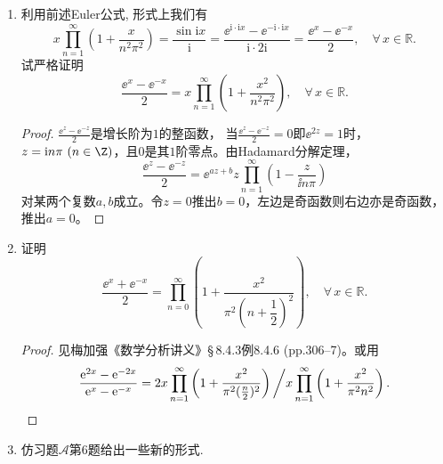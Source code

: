 \begin{4b}
\begin{enumerate}
\item 利用前述Euler公式, 形式上我们有
\[x\prod_{n=1}^{\infty}\left(1+\frac{x}{n^2\pi^2}\right)
=\frac{\sin\mathrm{i}x}{\mathrm{i}}
=\frac{\ee^{\mathrm{i}\cdot\mathrm{i}x}-\ee^{\mathrm{-i}\cdot\mathrm{i}x}}{\mathrm{i}\cdot 2\mathrm{i}}
=\frac{\ee^x-\ee^{-x}}{2},\quad\forall\, x\in\mathbb{R}.\]
试严格证明\[\frac{\ee^{x}-\ee^{-x}}{2}=x\prod_{n=1}^{\infty}\left(1+\frac{x^2}{n^2\pi^2}\right),\quad\forall\, x\in\mathbb{R}.\]
\begin{proof}
    \(\frac{\ee^{z}-\ee^{-z}}{2}\)是增长阶为$1$的整函数，
    当\(\frac{\ee^{z}-\ee^{-z}}{2}=0\)即$\ee^{2z}=1$时，
    $z=\ii n\pi\ (n\in\Z)$，且$0$是其$1$阶零点。由Hadamard分解定理，
    \[\frac{\ee^{z}-\ee^{-z}}{2}=\ee^{az+b}z\prod_{n=1}^\infty\left(1-\frac{z}{\ii n\pi}\right)\]
    对某两个复数$a,b$成立。令$z=0$推出$b=0$，左边是奇函数则右边亦是奇函数，推出$a=0$。
\end{proof}

\item 证明\[\frac{\ee^{x}+\ee^{-x}}{2}=\prod_{n=0}^{\infty}\left(1+\frac{x^2}{\pi^2\left(n+\dfrac{1}{2}\right)^2}\right),\quad\forall\, x\in\mathbb{R}.\]
\begin{proof}
    见梅加强《数学分析讲义》\S\,8.4.3例8.4.6 (pp.306--7)。或用
    \[\frac{\mathrm{e}^{2x}-\mathrm{e}^{-2x}}{\mathrm{e}^{x}-\mathrm{e}^{-x}}
    =2x\prod_{n=1}^\infty\left(1+\frac{x^2}{\pi^2(\frac{n}{2})^2}\right)
    \bigg/x\prod_{n=1}^\infty\left(1+\frac{x^2}{\pi^2n^2}\right).\qedhere\]
\end{proof}
\item 仿习题\(\boldsymbol{\mathcal{A}}\)第6题给出一些新的形式.
\end{enumerate}
\end{4b}